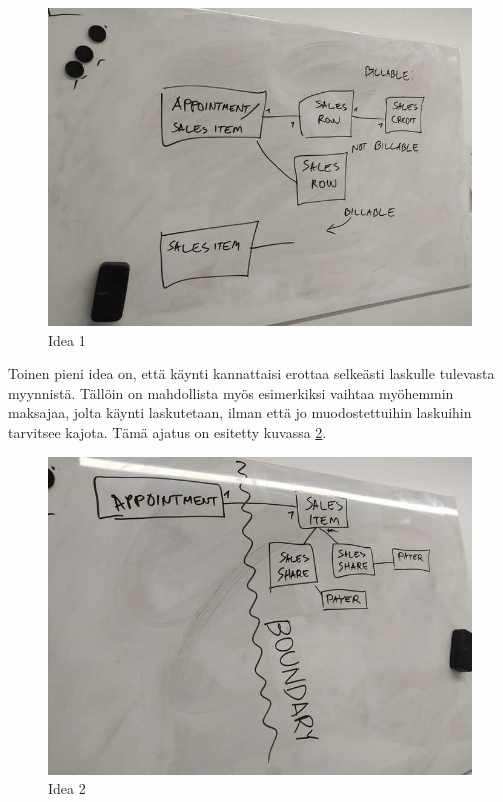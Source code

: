 \begin{figure}
\centering
\includegraphics{illustration/final-idea-1.jpg}
\caption{\label{finalidea1}Idea 1}
\end{figure}

Toinen pieni idea on, että käynti kannattaisi erottaa selkeästi laskulle
tulevasta myynnistä. Tällöin on mahdollista myös esimerkiksi vaihtaa
myöhemmin maksajaa, jolta käynti laskutetaan, ilman että jo
muodostettuihin laskuihin tarvitsee kajota. Tämä ajatus on esitetty
kuvassa \ref{finalidea2}.

\begin{figure}
\centering
\includegraphics{illustration/final-idea-2.jpg}
\caption{\label{finalidea2}Idea 2}
\end{figure}
